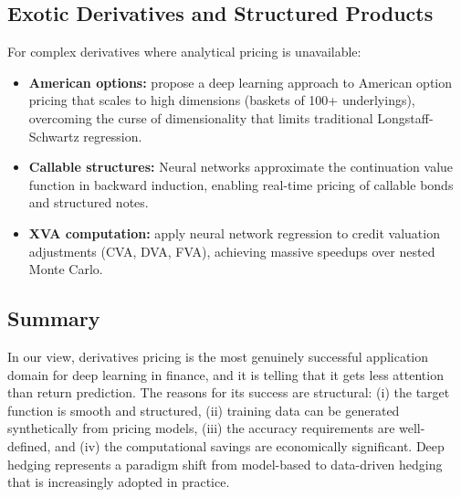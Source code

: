 \subsection{Exotic Derivatives and Structured Products}

For complex derivatives where analytical pricing is unavailable:

\begin{itemize}[leftmargin=*]
    \item \textbf{American options:} \citet{Becker2019} propose a deep learning approach to American option pricing that scales to high dimensions (baskets of 100+ underlyings), overcoming the curse of dimensionality that limits traditional Longstaff-Schwartz regression.

    \item \textbf{Callable structures:} Neural networks approximate the continuation value function in backward induction, enabling real-time pricing of callable bonds and structured notes.

    \item \textbf{XVA computation:} \citet{Gnoatto2023} apply neural network regression to credit valuation adjustments (CVA, DVA, FVA), achieving massive speedups over nested Monte Carlo.
\end{itemize}

\subsection{Summary}

In our view, derivatives pricing is the most genuinely successful application domain for deep learning in finance, and it is telling that it gets less attention than return prediction. The reasons for its success are structural: (i) the target function is smooth and structured, (ii) training data can be generated synthetically from pricing models, (iii) the accuracy requirements are well-defined, and (iv) the computational savings are economically significant. Deep hedging represents a paradigm shift from model-based to data-driven hedging that is increasingly adopted in practice.
